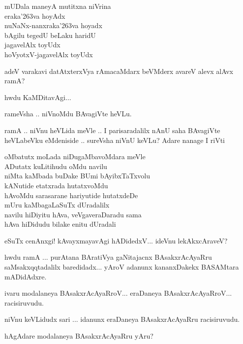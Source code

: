 \begin{description}
  \itemsep=1pt
\item[rameVsha:] mUDala maneyA mutitxna niVrina\\
eraka\char'263va hoyAdx\\
nuNaNx-nanxraka\char'263va hoyadx\\
bAgilu tegedU beLaku haridU\\
jagavelAlx toyUdx\\
hoVyotxV-jagavelAlx toyUdx

\item[rameVsha:] adeV varakavi datAtxterxVya rAmacaMdarx beVMderx avareV alevx alAvx ramA?

\item[ramA:] hwdu KaMDitavAgi$\ldots$

rameVsha .. niVnoMdu BAvagiVte heVLu.

\item[rameVsha:] ramA .. niVnu heVLida meVle .. I parisaradalilx nAnU saha BAvagiVte heVLabeVku eMdeniside .. sureVsha niVnU keVLu? Adare nanage I riVti 

\smallskip
oMbatutx moLada niDugaMbavoMdara meVle\\
ADutatx kuLitihudu oMdu navilu\\
niMta kaMbada buDake BUmi bAyibxTaTxvolu\\
kANutide etatxrada hutatxvoMdu\\
hAvoMdu sarasarane hariyutide hutatxdeDe\\
mUru kaMbagaLaSuTx dUradalilx\\
navilu hiDiyitu hAva, veVgaveraDaradu sama\\
hAva hiDidudu bilake enitu dUradali
\smallskip

\item[ramA:] eSuTx cenAnxgi! kAvayxmayavAgi hADidedxV... ideVnu lekAkxcAraveV?

\item[sureVsha:] hwdu ramA ... purAtana BAratiVya gaNitajacnx BAsakxrAcAyaRru saMsakxqqtadalilx baredidadx... yAroV adanunx kananxDakekx BASAMtara mADidAdxre.

\item[rameVsha:] ivaru modalaneya BAsakxrAcAyaRroV... eraDaneya BAsakxrA\-cAyaRroV... racisiruvudu.

\item[sureVsha:] niVnu keVLidudx sari ... idanunx eraDaneya BAsakxrAcAyaRru racisiruvudu.

\item[ramA:] hAgAdare modalaneya BAsakxrAcAyaRru yAru?


\end{description}
